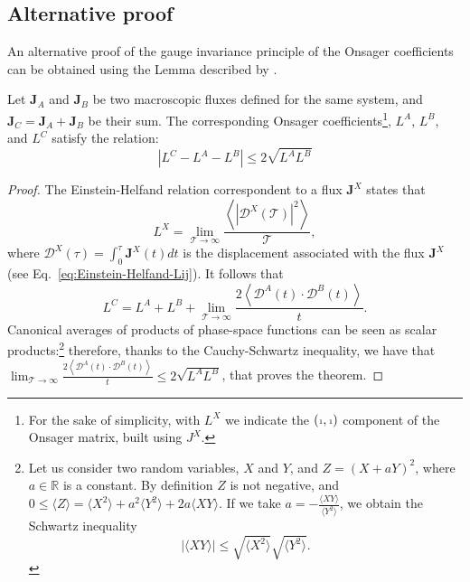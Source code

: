\subsection{Alternative proof}
\begin{LEtext}
An alternative proof of the gauge invariance principle of the Onsager coefficients can be obtained using the Lemma described by \citet{Marcolongo2016}.
\begin{theorem} \label{th:aris-theorem}
Let $\mathbf{J}_A$ and $\mathbf{J}_B$ be two macroscopic fluxes defined for the same system, and  $\mathbf{J}_{C} = \mathbf{J}_A + \mathbf{J}_B$ be their sum. The corresponding Onsager coefficients\footnote{For the sake of simplicity, with $L^X$ we indicate the $({\scriptscriptstyle 1},{\scriptscriptstyle 1})$ component of the Onsager matrix, built using $J^X$.
}, $L^{A}$, $L^{B}$, and $L^{C}$ satisfy the relation:
\begin{equation} \label{eq:aris-theorem}
    \left| L^{C} - L^{A} - L^{B} \right| \leq 2 \sqrt{L^{A} L^{B}}
\end{equation}
\end{theorem}
\begin{proof}
The Einstein-Helfand relation correspondent to a flux $\mathbf{J}^X$ states that 
\begin{equation}
    L^{X} = \lim_{\mathcal{T}\rightarrow\infty} \frac{\left\langle|\mathcal{D}^X(\mathcal{T})|^2\right\rangle} {\mathcal{T}},
\end{equation}
where $\mathcal{D}^X(\tau)=\int_0^\tau \mathbf{J}^X(t) dt$ is the displacement associated with the flux $\mathbf{J}^X$ (see Eq.~\eqref{eq:Einstein-Helfand-Lij}). It follows that 
\begin{equation}
    L^{C} = L^{A} + L^{B} + \lim_{\mathcal{T}\rightarrow\infty} \frac{2\left\langle \mathcal{D}^A(t) \cdot \mathcal{D}^B(t)\right\rangle} {t}.
\end{equation}
Canonical averages of products of phase-space functions can be seen as scalar products:\footnote{Let us consider two random variables, $X$ and $Y$, and $Z=(X+aY)^2$, where $a\in \mathbb{R}$ is a constant. By definition $Z$ is not negative, and $0\leq \langle Z \rangle = \langle X^2 \rangle + a^2 \langle Y^2 \rangle + 2a \langle XY \rangle$. If we take $a = -\frac{\langle XY \rangle}{\langle Y^2 \rangle}$, we obtain the Schwartz inequality
\begin{equation} \label{eq:schwartz-ineq}
    |\langle XY \rangle| \leq \sqrt{\langle X^2 \rangle} \sqrt{\langle Y^2 \rangle}.
\end{equation}}
therefore, thanks to the Cauchy-Schwartz inequality, we have that $\lim_{\mathcal{T}\rightarrow\infty} \frac{2\left\langle \mathcal{D}^A(t) \cdot \mathcal{D}^B(t)\right\rangle} {t} \leq 2\sqrt{L^{A} L^{B}}$, that proves the theorem. 
\end{proof}


\end{LEtext}
